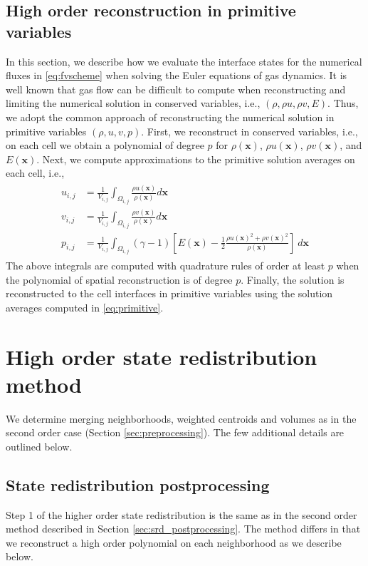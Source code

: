 \subsection{High order reconstruction in primitive variables} \label{sec:ho_reconstruction_primitive}
In this section, we describe how we evaluate the interface states for the numerical fluxes in \eqref{eq:fvscheme} when solving the Euler equations of gas dynamics.  It is well known that gas flow can be difficult to compute when reconstructing and limiting the numerical solution in conserved variables, i.e., $(\rho, \rho u, \rho v, E)$.  Thus, we adopt the common approach of reconstructing the numerical solution in primitive variables $(\rho, u, v, p)$.  First, we reconstruct in conserved variables, i.e., on each cell we obtain a polynomial of degree $p$ for $\rho(\mathbf{x})$, $\rho u(\mathbf{x})$, $\rho v(\mathbf{x})$, and $E(\mathbf{x})$.  Next, we compute approximations to the primitive solution averages on each cell, i.e.,
\begin{align} 
\begin{aligned}
u_{i,j} &= \frac{1}{V_{i,j}} \int_{\Omega_{i,j}} \frac{\rho u(\mathbf{x})}{\rho(\mathbf{x})} d\mathbf{x} \\
v_{i,j} &= \frac{1}{V_{i,j}} \int_{\Omega_{i,j}} \frac{\rho v(\mathbf{x})}{\rho(\mathbf{x})} d\mathbf{x} \\
p_{i,j} &= \frac{1}{V_{i,j}}\int_{\Omega_{i,j}} (\gamma-1) \left[E(\mathbf{x}) - \frac{1}{2}\frac{\rho u(\mathbf{x})^2+\rho v(\mathbf{x})^2}{\rho(\mathbf{x})} \right] ~d\mathbf{x}
\end{aligned}\label{eq:primitive}
\end{align}
The above integrals are computed with quadrature rules of order at 
least $p$ when the polynomial of spatial reconstruction is of 
degree $p$.  
Finally, the solution is reconstructed to the cell interfaces in 
primitive variables using the solution averages 
computed in \eqref{eq:primitive}.  

\section{High order state redistribution method} \label{sec:ho_reconstruction_q}


We determine merging neighborhoods, weighted centroids and volumes as in the second order case (Section \ref{sec:preprocessing}).  The few additional details are outlined below.

\subsection{State redistribution postprocessing} \label{sec:postprocessing_ho}
Step 1 of the higher order state redistribution is the same as in the 
second order method described in Section \ref{sec:srd_postprocessing}.  
The method differs in that we reconstruct a high order polynomial 
on each neighborhood as we describe below.


